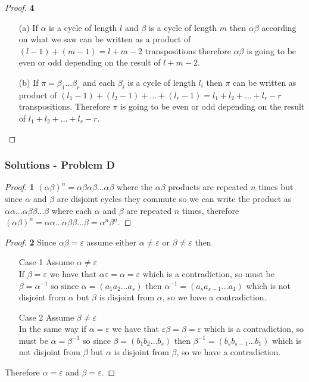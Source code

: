 \documentclass[11pt]{article}
\begin{document}
		\begin{proof}{\textbf{4}}
			\begin{itemize}
				\item[(a)] If $\alpha$ is a cycle of length $l$ and $\beta$ is
				a cycle of length $m$ then $\alpha\beta$ according on what we
				saw can be written as a product of $(l-1)+(m-1) = l+m-2$
				transpositions therefore $\alpha\beta$ is going to be even or
				odd depending on the result of $l+m-2$.
				\item[(b)] If $\pi = \beta_1 \dots \beta_r$ and each $\beta_i$
				is a cycle of length $l_i$ then $\pi$ can be written as product
				of $(l_1-1)+(l_2-1) + \dots + (l_r-1) = l_1+l_2+\dots+l_r-r$
				transpositions. Therefore $\pi$ is going
				to be even or odd depending on the result of $l_1+l_2+\dots+l_r-r$.
			\end{itemize}
		\end{proof}
	\subsubsection*{Solutions - Problem D}
		\begin{proof}{\textbf{1}}
			$(\alpha\beta)^n=\alpha\beta\alpha\beta \dots \alpha\beta$
			where the $\alpha\beta$ products are repeated $n$ times
			but since $\alpha$ and $\beta$ are disjoint cycles they commute so
			we can write the product as $\alpha\alpha \dots \alpha\beta\beta \dots \beta$
			where each $\alpha$ and $\beta$ are repeated $n$ times, therefore
			$(\alpha\beta)^n = \alpha\alpha \dots \alpha\beta\beta \dots \beta = \alpha^n\beta^n$.
		\end{proof}
\cleardoublepage
		\begin{proof}{\textbf{2}}
			Since $\alpha\beta = \varepsilon$ assume either $\alpha \neq \varepsilon$ or
			$\beta \neq \varepsilon$ then
			\begin{itemize}
				\item [Case 1] Assume $\alpha \neq \varepsilon$ \\
				If $\beta = \varepsilon$ we have that $\alpha\varepsilon = \alpha = \varepsilon$ which
				is a contradiction, so must be $\beta = \alpha^{-1}$ so since
				$\alpha = (a_1a_2 \dots a_s)$ then $\alpha^{-1} = (a_sa_{s-1} \dots a_1)$
				which is not disjoint from $\alpha$ but $\beta$ is disjoint
				from $\alpha$, so we have a contradiction.
				\item [Case 2] Assume $\beta \neq \varepsilon$ \\
				In the same way if $\alpha = \varepsilon$ we have that
				$\varepsilon\beta = \beta = \varepsilon$ which is a contradiction,
				so must be $\alpha = \beta^{-1}$ so since
				$\beta = (b_1b_2 \dots b_s)$ then $\beta^{-1} = (b_sb_{s-1} \dots b_1)$
				which is not disjoint from $\beta$ but $\alpha$ is disjoint
				from $\beta$, so we have a contradiction.
			\end{itemize}
			Therefore $\alpha = \varepsilon$ and $\beta = \varepsilon$.
		\end{proof}
\end{document}
